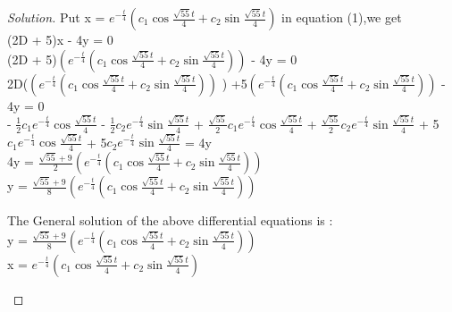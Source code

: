 \documentclass[12pt]{article}
\begin{document}
\begin{proof}[Solution]
Put  x = $e^{-\frac{t}{4}}(c_1 \cos{\frac{\sqrt{55}t}{4}} + c_2 \sin{\frac{\sqrt{55}t}{4}}) $ in equation (1),we get \\

(2D + 5)x - 4y = 0 \\

(2D + 5)$(e^{-\frac{t}{4}}(c_1 \cos{\frac{\sqrt{55}t}{4}} + c_2 \sin{\frac{\sqrt{55}t}{4}})) $ - 4y = 0 \\

2D($(e^{-\frac{t}{4}}(c_1 \cos{\frac{\sqrt{55}t}{4}} + c_2 \sin{\frac{\sqrt{55}t}{4}})) $ ) +5$(e^{-\frac{t}{4}}(c_1 \cos{\frac{\sqrt{55}t}{4}} + c_2 \sin{\frac{\sqrt{55}t}{4}})) $ - 4y = 0\\

- $\frac{1}{2} c_1 e^{-\frac{t}{4}} \cos{\frac{\sqrt{55}t}{4}} $ - $\frac{1}{2}  c_2 e^{-\frac{t}{4}} \sin{\frac{\sqrt{55}t}{4}}$ + $\frac{\sqrt{55}}{2} c_1 e^{-\frac{t}{4}} \cos{\frac{\sqrt{55}t}{4}} $ + $\frac{\sqrt{55}}{2}  c_2 e^{-\frac{t}{4}} \sin{\frac{\sqrt{55}t}{4}}$  + 5$c_1 e^{-\frac{t}{4}} \cos{\frac{\sqrt{55}t}{4}} $ + 5$ c_2 e^{-\frac{t}{4}} \sin{\frac{\sqrt{55}t}{4}}$  = 4y \\

 4y = $\frac{\sqrt{55}+ 9}{2}  (e^{-\frac{t}{4}}(c_1 \cos{\frac{\sqrt{55}t}{4}} + c_2 \sin{\frac{\sqrt{55}t}{4}})) $ \\
 
 y = $\frac{\sqrt{55} + 9}{8}(e^{-\frac{t}{4}}(c_1 \cos{\frac{\sqrt{55}t}{4}} + c_2 \sin{\frac{\sqrt{55}t}{4}})) $ \\
 
 \begin{Large}
 The General solution of the above differential equations is : \\
 
 y = $\frac{\sqrt{55} + 9}{8}(e^{-\frac{t}{4}}(c_1 \cos{\frac{\sqrt{55}t}{4}} + c_2 \sin{\frac{\sqrt{55}t}{4}})) $ \\
 
  x = $e^{-\frac{t}{4}}(c_1 \cos{\frac{\sqrt{55}t}{4}} + c_2 \sin{\frac{\sqrt{55}t}{4}}) $   \\
 \end{Large}
\end{proof}
\end{document}
